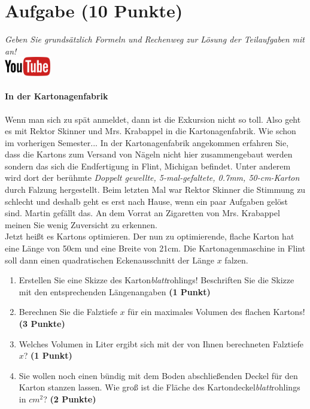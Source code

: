 \documentclass[a4paper, 9pt]{scrartcl}\usepackage[]{graphicx}\usepackage[]{xcolor}
\begin{document}
\section{Aufgabe \hfill (10 Punkte)}

\textit{Geben Sie grunds{\"a}tzlich Formeln und Rechenweg zur L{\"o}sung der
  Teilaufgaben mit an!} \\[1Ex]

\hfill\href{https://youtu.be/RuzMjwvwT-4}{\includegraphics[width =
  2cm]{img/youtube}} %
\hspace{2Ex}

\paragraph{In der Kartonagenfabrik}



Wenn man sich zu sp{\"a}t anmeldet, dann ist die Exkursion nicht so toll. Also
geht es mit Rektor Skinner und Mrs. Krabappel in die Kartonagenfabrik. Wie
schon im vorherigen Semester... In der Kartonagenfabrik angekommen erfahren
Sie, dass die Kartons zum Versand von N{\"a}geln nicht hier zusammengebaut
werden sondern das sich die Endfertigung in Flint, Michigan befindet. Unter
anderem wird dort der ber{\"u}hmte \textit{Doppelt gewellte,
  5-mal-gefaltete, 0.7mm, 50-cm-Karton} durch
Falzung hergestellt. Beim letzten Mal war Rektor Skinner die Stimmung zu
schlecht und deshalb geht es erst nach Hause, wenn ein paar Aufgaben gel{\"o}st
sind. Martin gef{\"a}llt das. An dem Vorrat
an Zigaretten von Mrs. Krabappel meinen Sie wenig Zuversicht zu erkennen.\\

Jetzt hei{\ss}t es Kartons optimieren. Der nun zu optimierende, flache Karton
hat eine L{\"a}nge von 50cm und eine Breite von 21cm. Die
Kartonagenmaschine in Flint soll dann einen quadratischen Eckenausschnitt
der L{\"a}nge $x$ falzen.

\begin{enumerate}
\item Erstellen Sie eine Skizze des Karton\textit{blatt}rohlings!
  Beschriften Sie die Skizze mit den entsprechenden L{\"a}ngenangaben
  \textbf{(1 Punkt)}
\item Berechnen Sie die Falztiefe $x$ f{\"u}r ein maximales Volumen des flachen
  Kartons! \textbf{(3 Punkte)}
\item Welches Volumen in Liter ergibt sich mit der von Ihnen berechneten
  Falztiefe $x$?  \textbf{(1 Punkt)}
\item Sie wollen noch einen b{\"u}ndig mit dem Boden abschlie{\ss}enden Deckel f{\"u}r
  den Karton stanzen lassen. Wie gro{\ss} ist die Fl{\"a}che des
  Kartondeckel\textit{blatt}rohlings in $cm^2$? \textbf{(2 Punkte)}
\end{enumerate}
\end{document}
